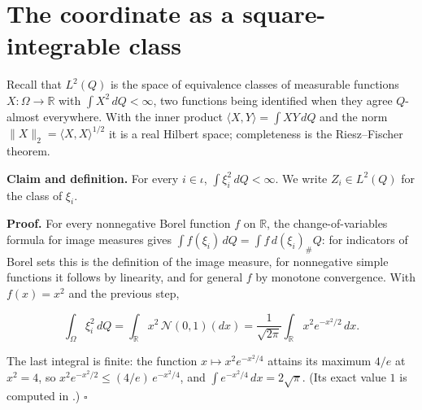 \documentclass[11pt,a4paper]{article}
\begin{document}
\section{\texorpdfstring{The coordinate as a square-integrable class}{The coordinate as a square-integrable class}}


Recall that \(L^2(Q)\) is the space of equivalence classes of measurable functions \(X:\Omega\to\mathbb R\) with \(\int X^2\,dQ<\infty\), two functions being identified when they agree \(Q\)-almost everywhere. With the inner product \(\langle X,Y\rangle=\int XY\,dQ\) and the norm \(\|X\|_2=\langle X,X\rangle^{1/2}\) it is a real Hilbert space; completeness is the Riesz–Fischer theorem.




\textbf{Claim and definition.} For every \(i\in\iota\), \(\int\xi_i^2\,dQ<\infty\). We write \(Z_i\in L^2(Q)\) for the class of \(\xi_i\).




\textbf{Proof.} For every nonnegative Borel function \(f\) on \(\mathbb R\), the change-of-variables formula for image measures gives \(\int f(\xi_i)\,dQ=\int f\,d(\xi_i)_\#Q\): for indicators of Borel sets this is the definition of the image measure, for nonnegative simple functions it follows by linearity, and for general \(f\) by monotone convergence. With \(f(x)=x^2\) and the previous step,


\[\int_\Omega\xi_i^2\,dQ=\int_{\mathbb R}x^2\,\mathcal N(0,1)(dx)=\frac1{\sqrt{2\pi}}\int_{\mathbb R}x^2e^{-x^2/2}\,dx.\]


The last integral is finite: the function \(x\mapsto x^2e^{-x^2/4}\) attains its maximum \(4/e\) at \(x^2=4\), so \(x^2e^{-x^2/2}\le(4/e)\,e^{-x^2/4}\), and \(\int e^{-x^2/4}\,dx=2\sqrt\pi\). (Its exact value \(1\) is computed in \cite[Section~3.6.8]{LangevinLean2026ULASC}.) \(\square\)
\end{document}

